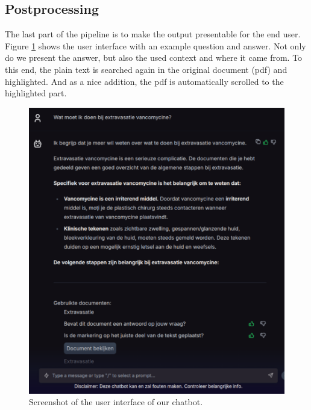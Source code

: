 \subsection{Postprocessing}
The last part of the pipeline is to make the output presentable for the end user. Figure \ref{fig:chatbot_zenya} shows the user interface with an example question and answer. Not only do we present the answer, but also the used context and where it came from. To this end, the plain text is searched again in the original document (pdf) and highlighted. And as a nice addition, the pdf is automatically scrolled to the highlighted part. 

\begin{figure}[h]
    \centerline{\includegraphics[width=0.7\linewidth]{fig/chatbot_zenya.png}}
    \caption{Screenshot of the user interface of our chatbot.}
    \label{fig:chatbot_zenya}
\end{figure}

